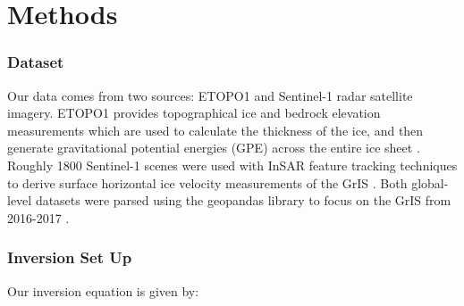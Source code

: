 \documentclass{article}
\begin{document}

\section{Methods}

\subsubsection{Dataset}
Our data comes from two sources: ETOPO1 and Sentinel-1 radar satellite imagery. ETOPO1 provides topographical ice and bedrock elevation measurements which are used to calculate the thickness of the ice, and then generate gravitational potential energies (GPE) across the entire ice sheet \cite{information_ncei_etopo1_nodate}. Roughly 1800 Sentinel-1 scenes were used with InSAR feature tracking techniques to derive surface horizontal ice velocity measurements of the GrIS \cite{nagler_sentinel-1_2015}. Both global-level datasets were parsed using the geopandas library to focus on the GrIS from 2016-2017 \cite{jordahl_geopandasgeopandas_2020}. 



\subsubsection{Inversion Set Up}

Our inversion equation is given by:
\end{document}
